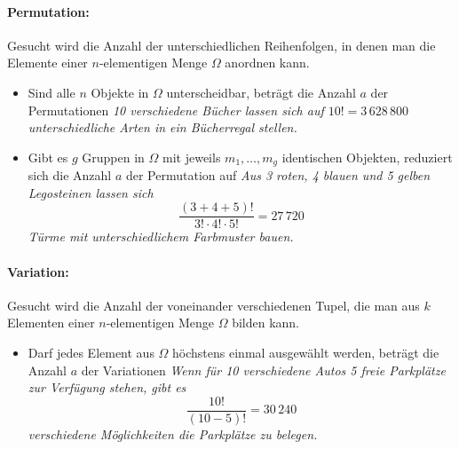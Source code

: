 \begin{minipage}[t]{0.45\textwidth}
  \paragraph{Permutation:} Gesucht wird die Anzahl der unterschiedlichen Reihenfolgen,
  in denen man die Elemente einer $n$-elementigen Menge $\Omega$ anordnen kann.
  \begin{itemize}
    \item Sind alle $n$ Objekte in $\Omega$ unterscheidbar, beträgt die
          Anzahl $a$ der Permutationen
          \newline
          \textit{10 verschiedene Bücher lassen sich auf $10!=3\,628\,800$
          unterschiedliche Arten in ein Bücherregal stellen.}
    \item Gibt es $g$ Gruppen in $\Omega$ mit jeweils $m_{1},\ldots,m_{g}$
          identischen Objekten, reduziert sich die Anzahl $a$ der Permutation auf
          \newline
          \textit{Aus 3 roten, 4 blauen und 5 gelben Legosteinen lassen sich}
          \begin{equation*}
            \frac{(3+4+5)!}{3!\cdot4!\cdot5!}=27\,720
          \end{equation*}
          \textit{Türme mit unterschiedlichem Farbmuster bauen.}
  \end{itemize}
  \paragraph{Variation:} Gesucht wird die Anzahl der voneinander verschiedenen
  Tupel, die man aus $k$ Elementen einer $n$-elementigen Menge $\Omega$
  bilden kann.
  \begin{itemize}
    \item Darf jedes Element aus $\Omega$ höchstens einmal ausgewählt
          werden, beträgt die Anzahl $a$ der Variationen
          \newline
          \textit{Wenn für 10 verschiedene Autos 5 freie Parkplätze zur Verfügung stehen, gibt es}
          \begin{equation*}
            \frac{10!}{(10-5)!}=30\,240
          \end{equation*}
          \textit{verschiedene Möglichkeiten die Parkplätze zu belegen.}
  \end{itemize}
\end{minipage}%
